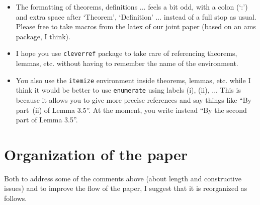 \documentclass[11pt, oneside]{article}   	%
\begin{document}
\begin{itemize}
\item The formatting of theorems, definitions ... feels a bit odd, with a colon (`:') and extra space after `Theorem', `Definition' ... instead of a full stop as usual. Please free to take macros from the latex of our joint paper (based on an {\sc ams} package, I think). 
\item I hope you use \texttt{cleverref} package to take care of referencing theorems, lemmas, etc. without having to remember the name of the environment. 
\item You also use the \texttt{itemize} environment inside theorems, lemmas, etc. while I think it would be better to use \texttt{enumerate} using labels (i), (ii), ... This is because it allows you to give more precise references and say things like ``By part~(ii) of Lemma 3.5''. At the moment, you write instead ``By the second part of Lemma 3.5''.
\end{itemize}


\newpage


\section{Organization of the paper}

Both to address some of the comments above (about length and constructive issues) and to improve the flow of the paper, I suggest that it is reorganized as follows. 
\end{document}
